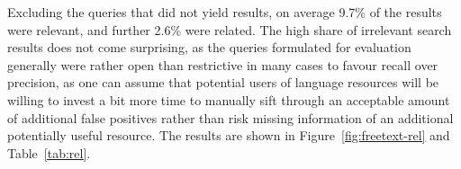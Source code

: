 \documentclass[smallextended]{svjour3}       %
\begin{document}



Excluding the queries that did not yield results, on average 9.7\% of the
results were relevant, and further 2.6\% were related. The high
share of irrelevant search results does not come surprising, as the queries
formulated for evaluation generally were rather open than restrictive in many
cases to favour recall over precision, as one can assume that potential users of
language resources will be willing to invest a bit more time to manually sift
through an acceptable amount of additional false positives rather than risk
missing information of an additional potentially useful resource. The results
are shown in Figure~\ref{fig:freetext-rel} and Table~\ref{tab:rel}.
\end{document}
